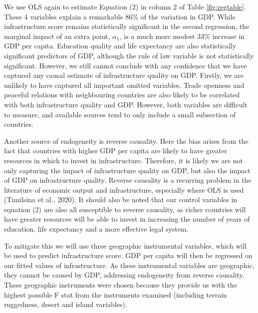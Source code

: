 \documentclass[12pt,a4paper]{article}
\begin{document}
We use OLS again to estimate Equation (2) in column 2 of Table \ref{fig:regtable}. These 4 variables explain a remarkable 86\% of the variation in GDP. While infrastructure score remains statistically significant in the second regression, the marginal impact of an extra point, $\alpha_1$, is a much more modest 33\% increase in GDP per capita. Education quality and life expectancy are also statistically significant predictors of GDP, although the rule of law variable is not statistically significant. However, we still cannot conclude with any confidence that we have captured any causal estimate of infrastructure quality on GDP. Firstly, we are unlikely to have captured all important omitted variables. Trade openness and peaceful relations with neighbouring countries are also likely to be correlated with both infrastructure quality and GDP. However, both variables are difficult to measure, and available sources tend to only include a small subsection of countries.

Another source of endogeneity is reverse causality. Here the bias arises from the fact that countries with higher GDP per capita are likely to have greater resources in which to invest in infrastructure. Therefore, it is likely we are not only capturing the impact of infrastructure quality on GDP, but also the impact of GDP on infrastructure quality. Reverse causality is a recurring problem in the literature of economic output and infrastructure, especially where OLS is used (Timilsina et al., 2020). It should also be noted that our control variables in equation (2) are also all susceptible to reverse causality, as richer countries will have greater resources will be able to invest in increasing the number of years of education, life expectancy and a more effective legal system.

To mitigate this we will use three geographic instrumental variables, which will be used to predict infrastructure score. GDP per capita will then be regressed on our fitted values of infrastructure. As these instrumental variables are geographic, they cannot be caused by GDP, addressing endogeneity from reverse causality. These geographic instruments were chosen because they provide us with the highest possible F stat from the instruments examined (including terrain ruggedness, desert and island variables).
\end{document}
